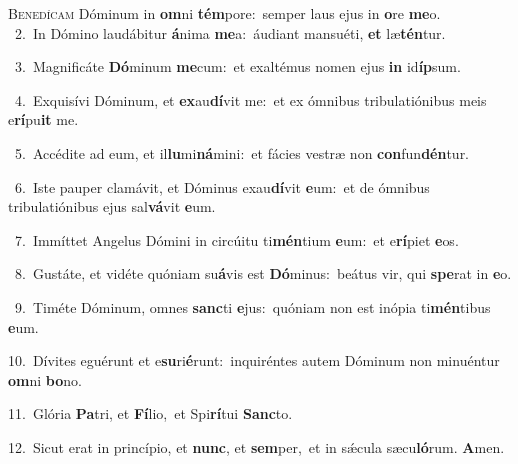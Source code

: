 \lettrine{\initial\textcolor{\initialcolor}{B}}{enedícam} Dóminum in \textbf{om}\-ni \textbf{tém}\-pore:~\star semper laus ejus in \textbf{o}\-re \textbf{me}\-o.\\
{\numbfont\textcolor{\numbcolor}{~2.}}~In Dómino laudábitur \textbf{á}\-nima \textbf{me}\-a:~\star áudiant mansuéti, \textbf{et} læ\-\textbf{tén}\-tur.\par
{\numbfont\textcolor{\numbcolor}{~3.}}~Magnificáte \textbf{Dó}\-minum \textbf{me}\-cum:~\star et exaltémus nomen ejus \textbf{in} id\-\textbf{íp}\-sum.\par
{\numbfont\textcolor{\numbcolor}{~4.}}~Exquisívi Dóminum, et \textbf{ex}\-au\-\textbf{dí}\-vit me:~\star et ex ómnibus tribulatiónibus meis e\-\textbf{rí}\-pu\textbf{it} me.\par
{\numbfont\textcolor{\numbcolor}{~5.}}~Accédite ad eum, et il\-\textbf{lu}\-mi\-\textbf{ná}\-mini:~\star et fácies vestræ non \textbf{con}\-fun\-\textbf{dén}\-tur.\par
{\numbfont\textcolor{\numbcolor}{~6.}}~Iste pauper clamávit, et Dóminus exau\-\textbf{dí}\-vit \textbf{e}\-um:~\star et de ómnibus tribulatiónibus ejus sal\-\textbf{vá}\-vit \textbf{e}\-um.\par
{\numbfont\textcolor{\numbcolor}{~7.}}~Immíttet Angelus Dómini in circúitu ti\-\textbf{mén}\-tium \textbf{e}\-um:~\star et e\-\textbf{rí}\-piet \textbf{e}\-os.\par
{\numbfont\textcolor{\numbcolor}{~8.}}~Gustáte, et vidéte quóniam su\-\textbf{á}\-vis est \textbf{Dó}\-minus:~\star beátus vir, qui \textbf{spe}\-rat in \textbf{e}\-o.\par
{\numbfont\textcolor{\numbcolor}{~9.}}~Timéte Dóminum, omnes \textbf{sanc}\-ti \textbf{e}\-jus:~\star quóniam non est inópia ti\-\textbf{mén}\-tibus \textbf{e}\-um.\par
{\numbfont\textcolor{\numbcolor}{10.}}~Dívites eguérunt et e\-\textbf{su}\-ri\-\textbf{é}\-runt:~\star inquiréntes autem Dóminum non minuéntur \textbf{om}\-ni \textbf{bo}\-no.\par
{\numbfont\textcolor{\numbcolor}{11.}}~Glória \textbf{Pa}\-tri, et \textbf{Fí}\-lio,~\star et Spi\-\textbf{rí}\-tui \textbf{Sanc}\-to.\par
{\numbfont\textcolor{\numbcolor}{12.}}~Sicut erat in princípio, et \textbf{nunc}\-, et \textbf{sem}\-per,~\star et in sǽcula sæcu\-\textbf{ló}\-rum. \textbf{A}\-men.\par
